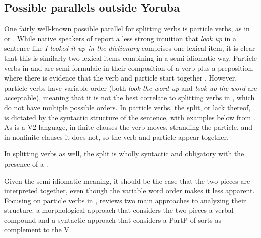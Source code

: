 \documentclass[output=paper,newtxmath,modfonts,nonflat,draftmode]{langsci/langscibook}
\begin{document}
\subsection{Possible parallels outside Yoruba}
\label{sect:parallels}

One fairly well-known possible parallel for splitting verbs is particle verbs, as in  or . While native speakers of  report a less strong intuition that \textit{look up} in a sentence like \textit{I looked it up in the dictionary} comprises one lexical item, it is clear that this is similarly two lexical items combining in a semi-idiomatic way. Particle verbs in  and  are semi-formulaic in their composition of a verb plus a preposition, where there is evidence that the verb and particle start together \citep{Johnson1991}. However,  particle verbs have variable order (both \textit{look the word up} and \textit{look up the word} are acceptable), meaning that it is not the best correlate to splitting verbs in , which do not have multiple possible orders. In  particle verbs, the split, or lack thereof, is dictated by the syntactic structure of the sentence, with examples below from \citet{Zeller2001}. As  is a V2 language, in finite clauses the verb moves, stranding the particle, and in nonfinite clauses it does not, so the verb and particle appear together.

\ea
 \z \label{german}
\z


In  splitting verbs as well, the split is wholly syntactic and obligatory with the presence of a . 

Given the semi-idiomatic meaning, it should be the case that the two pieces are interpreted together, even though the variable word order makes it less apparent. Focusing on particle verbs in , \citet{Zeller2001} reviews two main approaches to analyzing their structure: a morphological approach that considers the two pieces a verbal compound and a syntactic approach that considers a PartP of sorts as complement to the V. 
\end{document}
